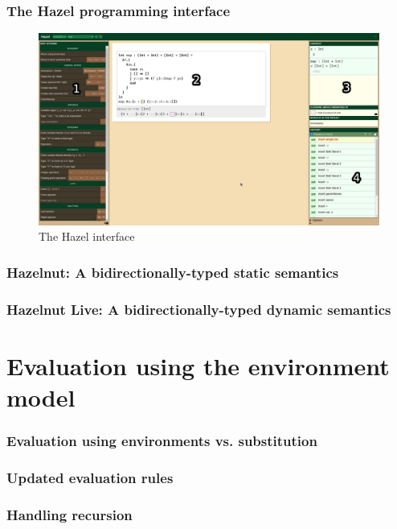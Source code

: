 \documentclass{beamer}
\begin{document}
\begin{frame}
  \frametitle{The Hazel programming interface}

  \begin{figure}
    \centering
    \includegraphics[width=.9\linewidth]{thesis/img/hazel_ui_annot.png}
    \caption{The Hazel interface}
    \label{fig:hazel-ui}
  \end{figure}

\end{frame}

\begin{frame}
  \frametitle{Hazelnut: A bidirectionally-typed static semantics}

\end{frame}

\begin{frame}
  \frametitle{Hazelnut Live: A bidirectionally-typed dynamic semantics}

\end{frame}

\section{Evaluation using the environment model}

\begin{frame}
  \frametitle{Evaluation using environments vs. substitution}
\end{frame}

\begin{frame}
  \frametitle{Updated evaluation rules}

\end{frame}

\begin{frame}
  \frametitle{Handling recursion}

\end{frame}
\end{document}
